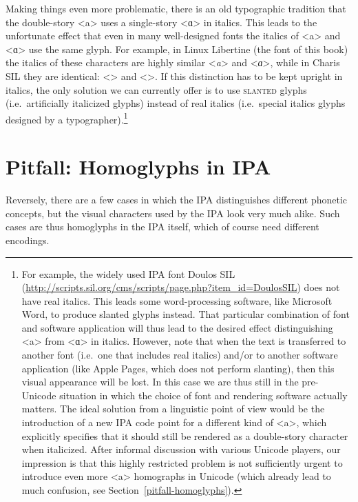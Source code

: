 Making things even more problematic, there is an old typographic tradition that
the double-story <a> uses a single-story <ɑ> in italics. This leads to the
unfortunate effect that even in many well-designed fonts the italics of <a> and
<ɑ> use the same glyph. For example, in Linux Libertine (the font of this book)
the italics of these characters are highly similar <\textit{a}> and
<\textit{ɑ}>, while in Charis SIL they are identical: <\textit{}> and
<\textit{}>. If this distinction has to be kept upright in italics,
the only solution we can currently offer is to use \textsc{slanted} glyphs
(i.e.~artificially italicized glyphs) instead of real italics (i.e.~special
italics glyphs designed by a typographer).\footnote{For example, the widely used
IPA font Doulos SIL
(\url{http://scripts.sil.org/cms/scripts/page.php?item\_id=DoulosSIL}) does not
have real italics. This leads some word-processing software, like Microsoft
Word, to produce slanted glyphs instead. That particular combination of font and
software application will thus lead to the desired effect distinguishing <a>
from <ɑ> in italics. However, note that when the text is transferred to another
font (i.e.~one that includes real italics) and/or to another software
application (like Apple Pages, which does not perform slanting), then this
visual appearance will be lost. In this case we are thus still in the
pre-Unicode situation in which the choice of font and rendering software
actually matters. The ideal solution from a linguistic point of view would be
the introduction of a new IPA code point for a different kind of <a>, which
explicitly specifies that it should still be rendered as a double-story
character when italicized. After informal discussion with various Unicode
players, our impression is that this highly restricted problem is not
sufficiently urgent to introduce even more <a> homographs in Unicode (which
already lead to much confusion, see Section~\ref{pitfall-homoglyphs}).}

\section{Pitfall: Homoglyphs in IPA}
\label{pitfall-homoglyphs-in-IPA}

Reversely, there are a few cases in which the IPA distinguishes different
phonetic concepts, but the visual characters used by the IPA look very much
alike. Such cases are thus homoglyphs in the IPA itself, which of course need
different encodings.


